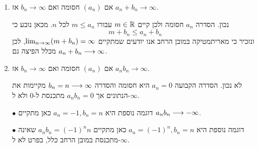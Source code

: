\begin{enumerate}
    \item
    אם
    $(a_n)$
    חסומה ואם
    $b_n\to\infty$
    אז
    $a_n+b_n\to\infty$.
\begin{solbox}
        נכון. הסדרה
        $a_n$
        חסומה ולכן קיים
        $m\in\mathbb{R}$
        עבורו
        $m\le a_n$
        לכל
        $n$.
        מכאן נובע כי
        $$m+b_n\le a_n+b_n$$
        ונזכיר כי מאריתמטיקה במובן הרחב אנו יודעים שמתקיים
        $\lim_{n\to\infty} (m+b_n)=\infty$,
        לכן מכלל הפיצה גם
        $a_n+b_n\longrightarrow \infty$.
\end{solbox}
    \item
    אם
    $(a_n)$
    חסומה ואם
    $b_n\to\infty$
    אז
    $a_nb_n\to\infty$.

\begin{solbox}
        לא נכון. הסדרה הקבועה
        $a_n=0$
        היא חסומה והסדרה
        $b_n=n\longrightarrow\infty$
        מקיימות את הנתונים אך
        $a_nb_n=0$
        מתכנסת ל-$0$
        ולא ל-$\infty$.

        $\bullet$
        דוגמה נוספת היא
        $a_n=-1,b_n=n$
        כאן מתקיים
        $a_nb_n\longrightarrow -\infty$.

        $\bullet$
        דוגמה נוספת היא
        $a_n=(-1)^n,b_n=n$
        כאן מתקיים
        $a_nb_n=(-1)^nn$
        שאינה מתכנסת במובן הרחב כלל, בפרט לא ל-$\infty$.
\end{solbox}
\end{enumerate}
